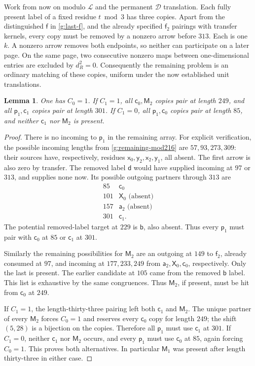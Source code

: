 \documentclass[11pt]{article}
\newtheorem{lemma}[theorem]{Lemma}
\theoremstyle{definition}
\theoremstyle{remark}
\numberwithin{equation}{section}
\begin{document}
Work from now on modulo $\mathcal L$ and the permanent
$\mathcal D$ translation.  Each fully present label
of a fixed residue $t\bmod3$ has three copies.
Apart from the distinguished $\mathsf f$ in
\eqref{g:last-f}, and the already specified
$\mathsf f_2$ pairings with transfer kernels,
every copy must be removed by a nonzero arrow
before $313$.  Each is one $k$.  A nonzero arrow removes both
endpoints, so neither can participate on a later page.
On the same page, two consecutive nonzero maps between
one-dimensional entries are excluded by $d_R^2=0$.
Consequently the remaining problem is an ordinary
matching of these copies, uniform under the now
established unit translations.

\begin{lemma}\label{g:p1-matching}
One has $C_0=1$.  If $C_1=1$, all
$\mathsf c_0,\mathsf M_2$ copies pair at length
$249$, and all $\mathsf p_1,\mathsf c_1$ copies
pair at length $301$.  If $C_1=0$, all
$\mathsf p_1,\mathsf c_0$ copies pair at length
$85$, and neither $\mathsf c_1$ nor
$\mathsf M_2$ is present.
\end{lemma}

\begin{proof}
There is no incoming to $\mathsf p_1$ in the
remaining array.  For explicit verification,
the possible incoming lengths from
\eqref{g:remaining-mod216} are $57,93,273,309$:
their sources have, respectively, residues
$\mathsf x_0,\mathsf y_2,\mathsf x_2,
\mathsf y_1$, all absent.  The first arrow is
also zero by transfer.  The removed label
$\mathsf d$ would have supplied incoming at
$97$ or $313$, and supplies none now.
Its possible outgoing partners through $313$
are
\[
 \begin{array}{c|c}
 85&\mathsf c_0\\
 101&\mathsf X_0\text{ (absent)}\\
 157&\mathsf a_2\text{ (absent)}\\
 301&\mathsf c_1.
 \end{array}
\]
The potential removed-label target at $229$ is
$\mathsf b$, also absent.  Thus every
$\mathsf p_1$ must pair with $\mathsf c_0$ at
$85$ or $\mathsf c_1$ at $301$.

Similarly the remaining possibilities for
$\mathsf M_2$ are an outgoing at $149$ to
$\mathsf f_2$, already consumed at $97$, and
incoming at $177,233,249$ from
$\mathsf a_2,\mathsf X_0,\mathsf c_0$,
respectively.  Only the last is present.  The
earlier candidate at $105$ came from the
removed $\mathsf b$ label.  This list is
exhaustive by the same congruences.  Thus
$\mathsf M_2$, if present, must be hit from
$\mathsf c_0$ at $249$.

If $C_1=1$, the length-thirty-three pairing
left both $\mathsf c_1$ and $\mathsf M_2$.
The unique partner of every $\mathsf M_2$
forces $C_0=1$ and reserves every
$\mathsf c_0$ copy for length $249$; the
shift $(5,28)$ is a bijection on the copies.
Therefore all $\mathsf p_1$ must use
$\mathsf c_1$ at $301$.
If $C_1=0$, neither $\mathsf c_1$ nor
$\mathsf M_2$ occurs, and every
$\mathsf p_1$ must use $\mathsf c_0$ at
$85$, again forcing $C_0=1$.  This proves
both alternatives.  In particular
$\mathsf M_1$ was present after length
thirty-three in either case.
\end{proof}
\end{document}
